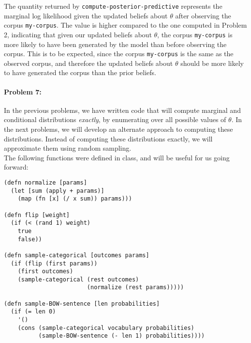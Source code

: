 \documentclass[10pt]{article}
\newenvironment{AnswerBox}{\begin{mdframed}[style=simple]}{\end{mdframed}}
\begin{document}
\begin{AnswerBox}%

    The quantity returned by \texttt{compute-posterior-predictive} represents the marginal log likelihood given the updated beliefs about $\theta$ after observing the corpus \texttt{my-corpus}. The value is higher compared to the one computed in Problem 2, indicating that given our updated beliefs about $\theta$, the corpus \texttt{my-corpus} is more likely to have been generated by the model than before observing the corpus. This is to be expected, since the corpus \texttt{my-corpus} is the same as the observed corpus, and therefore the updated beliefs about $\theta$ should be more likely to have generated the corpus than the prior beliefs.
    
\end{AnswerBox}%

\hrulefill %

\paragraph{Problem 7:}
In the previous problems, we have written code that will compute
marginal and conditional distributions \emph{exactly}, by enumerating
over all possible values of $\theta$. In the next problems, we will
develop an alternate approach to computing these distributions.
Instead of computing these distributions exactly, we will approximate
them using random sampling.  \\

 The following functions were defined in class, and will be
useful for us going forward:

\begin{lstlisting}
(defn normalize [params]
  (let [sum (apply + params)]
    (map (fn [x] (/ x sum)) params)))

(defn flip [weight]
  (if (< (rand 1) weight)
    true
    false))

(defn sample-categorical [outcomes params]
  (if (flip (first params))
    (first outcomes)
    (sample-categorical (rest outcomes) 
                        (normalize (rest params)))))

(defn sample-BOW-sentence [len probabilities]
  (if (= len 0)
    '()
    (cons (sample-categorical vocabulary probabilities)
          (sample-BOW-sentence (- len 1) probabilities))))
\end{lstlisting}
\end{document}
